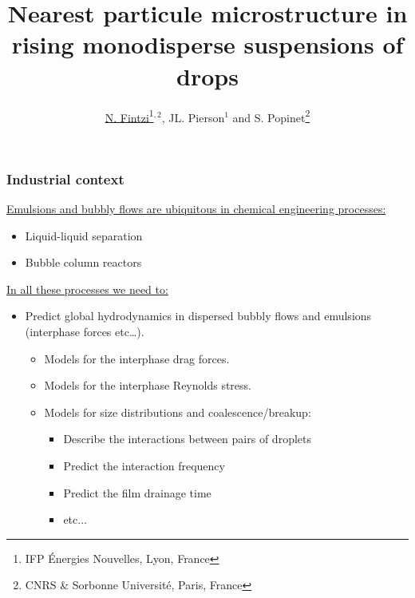 \documentclass{sintefbeamer}
\title{Nearest particule microstructure in rising monodisperse suspensions of drops\break}
\author{\href{http://basilisk.fr/sandbox/fintzin/Rising-Suspenion/RS.c}{\underline{N. Fintzi}\footnote{IFP \'Energies Nouvelles, Lyon, France}$^{,2}$}, JL. Pierson$^1$ and S. Popinet\footnote{CNRS \& Sorbonne Universit\'e, Paris, France}}
\begin{document}
\maketitle

\begin{frame}
  \frametitle{Industrial context}
  \underline{Emulsions and bubbly flows are ubiquitous in chemical engineering processes:}
  \begin{itemize}
    \item Liquid-liquid separation
    \item Bubble column reactors
  \end{itemize}
  \vfill
  \underline{In all these processes we need to: }
  \begin{itemize}
    \item Predict global hydrodynamics in dispersed bubbly flows and emulsions (interphase forces etc\ldots).
    \begin{itemize}
      \item Models for the interphase drag forces.
      \item Models for the interphase Reynolds stress.
      \item Models for size distributions and coalescence/breakup:
      \begin{itemize}
        \item Describe the interactions between pairs of droplets
        \item Predict the interaction frequency
        \item Predict the film drainage time
        \item etc...
      \end{itemize}
    \end{itemize}
  \end{itemize}

  \vfill
\end{frame}
\end{document}
